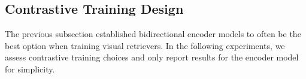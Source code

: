 
\subsection{Contrastive Training Design} 

The previous subsection established bidirectional encoder models to often be the best option when training visual retrievers. In the following experiments, we assess contrastive training choices and only report results for the encoder model for simplicity.




